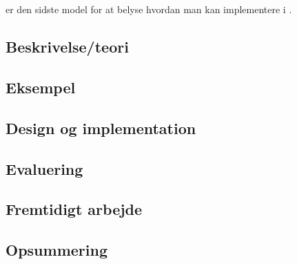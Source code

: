 \chapter{\is}
\label{chap:is}

\is er den sidste model for at belyse hvordan man kan implementere i \pycsp.
  \section{Beskrivelse/teori}
  \section{Eksempel}
  \section{Design og implementation}
  \section{Evaluering}
  \section{Fremtidigt arbejde}
  \section{Opsummering}
